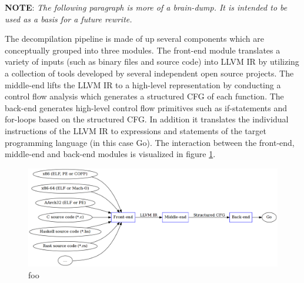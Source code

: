 

\textbf{NOTE}: \textit{The following paragraph is more of a brain-dump. It is intended to be used as a basis for a future rewrite.}

The decompilation pipeline is made of up several components which are conceptually grouped into three modules. The front-end module translates a variety of inputs (such as binary files and source code) into LLVM IR by utilizing a collection of tools developed by several independent open source projects. The middle-end lifts the LLVM IR to a high-level representation by conducting a control flow analysis which generates a structured CFG of each function. The back-end generates high-level control flow primitives such as if-statements and for-loops based on the structured CFG. In addition it translates the individual instructions of the LLVM IR to expressions and statements of the target programming language (in this case Go). The interaction between the front-end, middle-end and back-end modules is visualized in figure \ref{fig:decompilation_pipeline}.



\begin{figure}[htbp]
	\begin{center}
		\includegraphics[width=\textwidth]{inc/decompilation_pipeline.png}
		\caption{foo}
		\label{fig:decompilation_pipeline}
	\end{center}
\end{figure}


